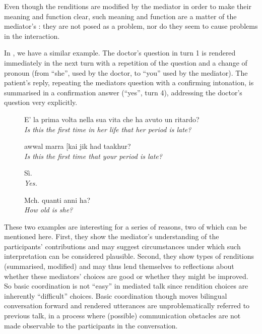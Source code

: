 \documentclass[output=paper]{LSP/langsci}
\begin{document}
\clearpage
Even though the renditions are modified by the mediator in order to make their meaning and function clear, such meaning and function are a matter of the mediator's : they are not posed as a problem, nor do they seem to cause problems in the interaction.

  In , we have a similar example. The doctor's question in turn 1 is rendered immediately in the next turn with a repetition of the question and a change of pronoun (from ``she'', used by the doctor, to ``you'' used by the mediator). The patient's reply, repeating the mediators question with a confirming intonation, is summarised in a confirmation answer (``yes'', turn 4), addressing the doctor's question very explicitly.

\begin{figure}
	\begin{varwidth}{\textwidth}
	\begin{description}[align=left, nosep, style=nextline, leftmargin=3em, format=\normalfont\footnotesize]
	\item [1 \hspace{0.3em} D:] E' la prima volta nella sua vita che ha avuto un ritardo? \\ \textit{Is this the first time in her life that her period is late?}
	\item [2 \hspace{0.3em} M:] awwal marra [kai jik had taakhur? \\ \textit{Is this the first time that your period is late?}
	\item [3 \hspace{0.3em} P:]  [awwal marra, dart liya had taakhur. \\ \textit{This is the first time my period is late.}
	\item [4 \hspace{0.3em} M:] Sì. \\ \textit{Yes.}
	\item [5 \hspace{0.3em} D:] Mch. quanti anni ha? \\ \textit{How old is she?}
	\end{description}
    \end{varwidth}
\caption{}
\label{baraldi-gavioli:extract:2}
\end{figure}

These two examples are interesting for a series of reasons, two of which can be mentioned here. First, they show the mediator's understanding of the participants' contributions and may suggest circumstances under which such interpretation can be considered plausible. Second, they show types of renditions (summarised, modified) and may thus lend themselves to reflections about whether these mediators' choices are good or whether they might be improved. So basic coordination is not ``easy'' in mediated talk since rendition choices are inherently ``difficult'' choices. Basic coordination though moves bilingual conversation forward and rendered utterances are unproblematically referred to previous talk, in a process where (possible) communication obstacles are not made observable to the participants in the conversation. 
\end{document}
